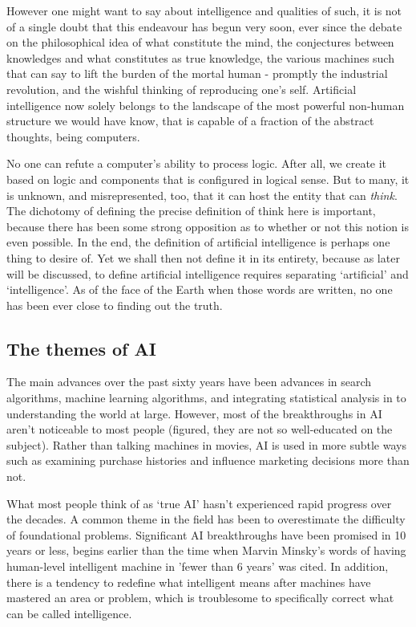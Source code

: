 However one might want to say about intelligence and qualities of such, it is not of a single doubt that this endeavour has begun very soon, ever since the debate on the philosophical idea of what constitute the mind, the conjectures between knowledges and what constitutes as true knowledge, the various machines such that can say to lift the burden of the mortal human - promptly the industrial revolution, and the wishful thinking of reproducing one's self. Artificial intelligence now solely belongs to the landscape of the most powerful non-human structure we would have know, that is capable of a fraction of the abstract thoughts, being computers. 

No one can refute a computer's ability to process logic. After all, we create it based on logic and components that is configured in logical sense. But to many, it is unknown, and misrepresented, too, that it can host the entity that can \textit{think}. The dichotomy of defining the precise definition of think here is important, because there has been some strong opposition as to whether or not this notion is even possible. In the end, the definition of artificial intelligence is perhaps one thing to desire of. Yet we shall then not define it in its entirety, because as later will be discussed, to define artificial intelligence requires separating `artificial' and `intelligence'. As of the face of the Earth when those words are written, no one has been ever close to finding out the truth. 
\subsection{The themes of AI}
The main advances over the past sixty years have been advances in search algorithms, machine learning algorithms, and integrating statistical analysis in to understanding the world at large. However, most of the breakthroughs in AI aren't noticeable to most people (figured, they are not so well-educated on the subject). Rather than talking machines in movies, AI is used in more subtle ways such as examining purchase histories and influence marketing decisions more than not. 

What most people think of as `true AI' hasn't experienced rapid progress over the decades. A common theme in the field has been to overestimate the difficulty of foundational problems. Significant AI breakthroughs have been promised in 10 years or less, begins earlier than the time when Marvin Minsky's words of having human-level intelligent machine in 'fewer than 6 years' was cited. In addition, there is a tendency to redefine what intelligent means after machines have mastered an area or problem, which is troublesome to specifically correct what can be called intelligence. 


